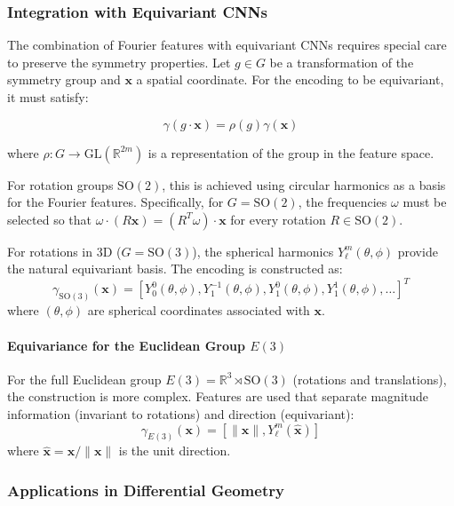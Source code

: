 \subsubsection{Integration with Equivariant CNNs}

The combination of Fourier features with equivariant CNNs requires special care to preserve the symmetry properties. Let $g \in G$ be a transformation of the symmetry group and $\mathbf{x}$ a spatial coordinate. For the encoding to be equivariant, it must satisfy:

\begin{equation}
\gamma(g \cdot \mathbf{x}) = \rho(g) \gamma(\mathbf{x})
\end{equation}

where $\rho: G \to \text{GL}(\mathbb{R}^{2m})$ is a representation of the group in the feature space.

For rotation groups $\text{SO}(2)$, this is achieved using circular harmonics as a basis for the Fourier features. Specifically, for $G = \text{SO}(2)$, the frequencies $\omega$ must be selected so that $\omega \cdot (R\mathbf{x}) = (R^T\omega) \cdot \mathbf{x}$ for every rotation $R \in \text{SO}(2)$.

For rotations in 3D ($G = \text{SO}(3)$), the spherical harmonics $Y_\ell^m(\theta, \phi)$ provide the natural equivariant basis. The encoding is constructed as:
\begin{equation}
\gamma_{\text{SO}(3)}(\mathbf{x}) = [Y_0^0(\theta, \phi), Y_1^{-1}(\theta, \phi), Y_1^0(\theta, \phi), Y_1^1(\theta, \phi), \ldots]^T
\end{equation}
where $(\theta, \phi)$ are spherical coordinates associated with $\mathbf{x}$.

\paragraph{Equivariance for the Euclidean Group $E(3)$}

For the full Euclidean group $E(3) = \mathbb{R}^3 \rtimes \text{SO}(3)$ (rotations and translations), the construction is more complex. Features are used that separate magnitude information (invariant to rotations) and direction (equivariant):
\begin{equation}
\gamma_{E(3)}(\mathbf{x}) = [\|\mathbf{x}\|, Y_\ell^m(\hat{\mathbf{x}})]
\end{equation}
where $\hat{\mathbf{x}} = \mathbf{x}/\|\mathbf{x}\|$ is the unit direction.

\subsubsection{Applications in Differential Geometry}

